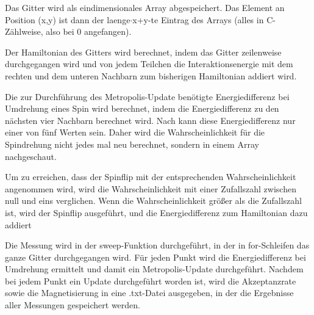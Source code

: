 \documentclass{scrreprt}
\begin{document}
	
	Das Gitter wird als eindimensionales Array abgespeichert. Das Element an Position (x,y) ist dann der laenge$\cdot$x+y-te Eintrag des Arrays (alles in C-Zählweise, also bei 0 angefangen).

	Der Hamiltonian des Gitters wird berechnet, indem das Gitter zeilenweise durchgegangen wird und von jedem Teilchen die Interaktionsenergie mit dem rechten und dem unteren Nachbarn zum bisherigen Hamiltonian addiert wird.
	
	Die zur Durchführung des Metropolis-Update benötigte Energiedifferenz bei Umdrehung eines Spin wird berechnet, indem die Energiedifferenz zu den nächsten vier Nachbarn berechnet wird. 
	Nach \cite[S. 103]{binderheermann} kann diese Energiedifferenz nur einer von fünf Werten sein. Daher wird die Wahrscheinlichkeit für die Spindrehung nicht jedes mal neu berechnet, sondern in einem Array nachgeschaut.
	
	Um zu erreichen, dass der Spinflip mit der entsprechenden Wahrscheinlichkeit angenommen wird, wird die Wahrscheinlichkeit mit einer Zufallszahl zwischen null und eins verglichen\cite[nach][]{metropolisupdate}. Wenn die Wahrscheinlichkeit größer als die Zufallszahl ist, wird der Spinflip ausgeführt, und die Energiedifferenz zum Hamiltonian dazu addiert
	
	Die Messung wird in der sweep-Funktion durchgeführt, in der in for-Schleifen das ganze Gitter durchgegangen wird. Für jeden Punkt wird die Energiedifferenz bei Umdrehung ermittelt und damit ein Metropolis-Update durchgeführt. Nachdem bei jedem Punkt ein Update durchgeführt worden ist, wird die Akzeptanzrate sowie die Magnetisierung in eine .txt-Datei ausgegeben, in der die Ergebnisse aller Messungen gespeichert werden.
	
\end{document}
